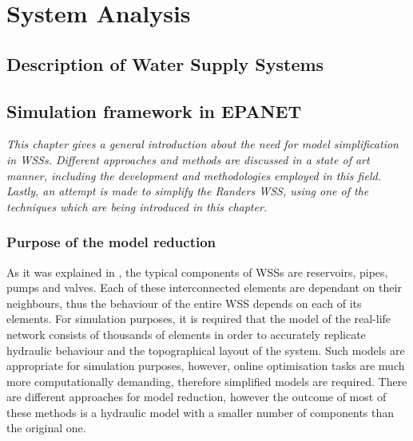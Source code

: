 
\part{System Analysis}
\label{system_analysis}

\chapter{Description of Water Supply Systems}
\label{description_of_water_supply_systems}

 





\chapter{Simulation framework in EPANET}
\label{simulation_framework_in_EPANET}

\emph{This chapter gives a general introduction about the need for model simplification in WSSs. Different approaches and methods are discussed in a state of art manner, including the development and methodologies employed in this field. Lastly, an attempt is made to simplify the Randers WSS, using one of the techniques which are being introduced in this chapter. }

\section{Purpose of the model reduction}
\label{purpose_of_the_model_reduction}

As it was explained in , the typical components of WSSs are reservoirs, pipes, pumps and valves. Each of these interconnected elements are dependant on their neighbours, thus the behaviour of the entire WSS depends on each of its elements. For simulation purposes, it is required that the model of the real-life network consists of thousands of elements in order to accurately replicate hydraulic behaviour and the topographical layout of the system. Such models are appropriate for simulation purposes, however, online optimisation tasks are much more computationally demanding, therefore simplified models are required. There are different approaches for model reduction, however the outcome of most of these methods is a hydraulic model with a smaller number of components than the original one. 

